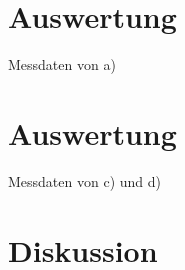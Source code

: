\section{Auswertung}\justifying

  \begin{table}[H]
        \centering
        \caption{Messdaten von a)}
         
        \label{tab:data_a}
  \end{table}

\section{Auswertung}\justifying

  \begin{table}[H]
        \centering
        \caption{Messdaten von c) und d)}
         
        \label{tab:data_c}
  \end{table}


\section{Diskussion}\justifying

\newpage
\nocite{V354}
\nocite{V353}
\printbibliography





